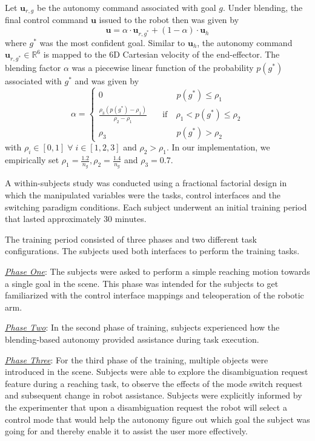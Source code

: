 \documentclass[journal]{IEEEtran}
\begin{document}
Let $\boldsymbol{u}_{r,g}$ be the autonomy command associated with goal $g$. Under blending, the final control command $\boldsymbol{u}$ issued to the robot then was given by
\begin{equation*}
\boldsymbol{u} = \alpha\cdot \boldsymbol{u}_{r,g^*} + (1 - \alpha)\cdot \boldsymbol{u}_h
\end{equation*}
where $g^*$ was the most confident goal. Similar to $\boldsymbol{u}_h$, the autonomy command $\boldsymbol{u}_{r, g^*} \in \mathbb{R}^6$ is mapped to the 6D Cartesian velocity of the end-effector. 
The blending factor $\alpha$ was a piecewise linear function of the probability $p(g^*)$ associated with $g^*$ and was given by
$$
\alpha = \left\{
\begin{array}{ll}
0 & \quad\quad~~~ p(g^*) \leq \rho_1 \\
\frac{\rho_3 (p(g^*) - \rho_1)}{\rho_2 - \rho_1}  &  \quad \text{if}\quad \rho_1 < p(g^*) \leq \rho_2  \\
\rho_3 & \quad\quad~~~ p(g^*) > \rho_2 	
\end{array}
\right.
$$
with $\rho_i \in [0, 1] \;\forall\; i \in [1,2,3]$ and $ \rho_2 > \rho_1$. 
In our implementation, we empirically set $\rho_1 = \frac{1.2}{n_g}, \rho_2 = \frac{1.4}{n_g}$ and $ \rho_3 = 0.7$.

 A within-subjects study was conducted using a fractional factorial design in which the manipulated variables were the tasks, control interfaces and the switching paradigm conditions. Each subject underwent an initial training period that lasted approximately 30 minutes. 

The training period consisted of three phases and two different task configurations. The subjects used both interfaces to perform the training tasks.

\underline{\textit{Phase One}}: The subjects were asked to perform a simple reaching motion towards a single goal in the scene. This phase was intended for the subjects to get familiarized with the control interface mappings and teleoperation of the robotic arm.

\underline{\textit{Phase Two}}: In the second phase of training, subjects experienced how the blending-based autonomy provided assistance during task execution. 

\underline{\textit{Phase Three}}: For the third phase of the training, multiple objects were introduced in the scene. Subjects were able to explore the disambiguation request feature during a reaching task, to observe the effects of the mode switch request and subsequent change in robot assistance. 
Subjects were explicitly informed by the experimenter that upon a disambiguation request the robot will select a control mode that would help the autonomy figure out which goal the subject was going for and thereby enable it to assist the user more effectively.
\end{document}
